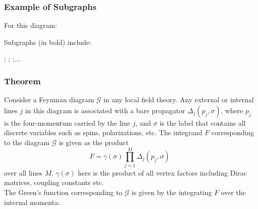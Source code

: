 \documentclass{article}
\begin{document}
\subsubsection{Example of Subgraphs}
For this diagram:
\begin{center}
\end{center}
Subgraphs (in bold) include:\\
\begin{center}    
    ;
    ;
    ;...\\
\end{center}

\subsubsection{Theorem}
Consider a Feynman diagram $\mathcal{G}$ in any local field theory. Any external or internal lines $j$ in this diagram is associated with a bare propagator $\Delta_j(p_j,\sigma)$, where $p_j$ is the four-momentum carried by the line $j$, and $\sigma$ is the label that contains all discrete variables such as spins, polarizations, etc. The integrand $F$ corresponding to the diagram $\mathcal{G}$  is given as the product
\begin{equation}
    F= \gamma(\sigma)\prod_{j=1}^M \Delta_j(p_j,\sigma)
\end{equation}
over all lines $M$. $\gamma(\sigma)$ here is the product of all vertex factors including Dirac matrices, coupling constants etc. \\

The Green's function corresponding to $\mathcal{G}$ is given by the integrating $F$ over the internal momenta:
\end{document}
